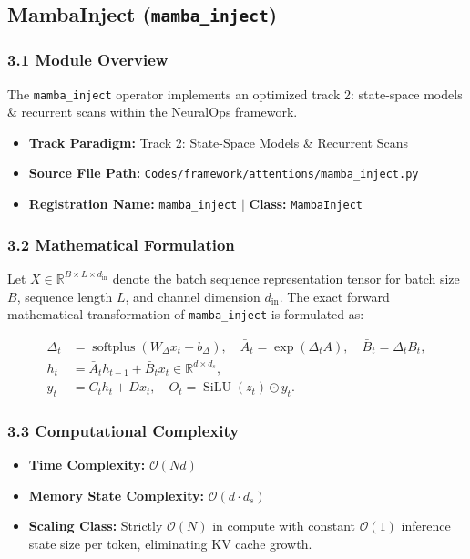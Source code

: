 \subsection{MambaInject (\texttt{mamba\_inject})}
\label{sec:app_module_mamba_inject}

\subsubsection*{3.1 Module Overview}
The \texttt{mamba\_inject} operator implements an optimized track 2: state-space models \& recurrent scans within the NeuralOps framework.
\begin{itemize}
    \item \textbf{Track Paradigm:} Track 2: State-Space Models \& Recurrent Scans
    \item \textbf{Source File Path:} \texttt{Codes/framework/attentions/mamba\_inject.py}
    \item \textbf{Registration Name:} \texttt{mamba\_inject} $\mid$ \textbf{Class:} \texttt{MambaInject}
\end{itemize}

\subsubsection*{3.2 Mathematical Formulation}
Let $X \in \mathbb{R}^{B \times L \times d_{\text{in}}}$ denote the batch sequence representation tensor for batch size $B$, sequence length $L$, and channel dimension $d_{\text{in}}$. The exact forward mathematical transformation of \texttt{mamba\_inject} is formulated as:

\begin{align}
\Delta_t &= \operatorname{softplus}(W_\Delta x_t + b_\Delta), \quad \bar{A}_t = \exp(\Delta_t A), \quad \bar{B}_t = \Delta_t B_t, \\
h_t &= \bar{A}_t h_{t-1} + \bar{B}_t x_t \in \mathbb{R}^{d \times d_s}, \\
y_t &= C_t h_t + D x_t, \quad O_t = \operatorname{SiLU}(z_t) \odot y_t.
\end{align}


\subsubsection*{3.3 Computational Complexity}
\begin{itemize}
    \item \textbf{Time Complexity:} $\mathcal{O}(N d)$
    \item \textbf{Memory State Complexity:} $\mathcal{O}(d \cdot d_s)$
    \item \textbf{Scaling Class:} Strictly $\mathcal{O}(N)$ in compute with constant $\mathcal{O}(1)$ inference state size per token, eliminating KV cache growth.
\end{itemize}

